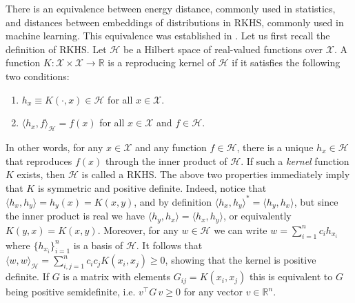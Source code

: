 \documentclass[aps,preprint,nofootinbib,floatfix]{revtex4-1}
\newcommand\kk{K}
\newcommand\kkk{h}
\newcommand\HH{\mathcal{H}}
\begin{document}
There is an equivalence between energy distance, 
commonly used in statistics,
and distances between embeddings of distributions in 
RKHS, commonly used in machine learning. 
This equivalence was established
in \cite{Sejdinovic2013}. Let us first recall the definition of
RKHS. Let $\HH$ be a Hilbert space of real-valued functions
over $\mathcal{X}$. A function 
$\kk : \mathcal{X} \times \mathcal{X} \to 
\mathbb{R}$ is a reproducing kernel of $\HH$ if it satisfies
the following two conditions:
\begin{enumerate}
\item $\kkk_x \equiv \kk(\cdot, x) \in \HH$ 
for all $x \in \mathcal{X}$.
\item $\langle \kkk_x, f \rangle_{\HH} = f(x)$ for
all $x\in\mathcal{X}$ and $f\in \HH$.
\end{enumerate}
In other words, for any $x \in \mathcal{X}$ and any function $f \in \HH$,
there is a unique 
$\kkk_x \in \HH$ that reproduces $f(x)$ through the inner product
of $\HH$.
If such a \emph{kernel} 
function $\kk$ exists, then $\HH$ is called a RKHS. The above two 
properties immediately imply that $\kk$ is symmetric and positive
definite. Indeed, notice that
$\langle \kkk_x, \kkk_y \rangle = \kkk_y(x) = \kk(x,y)$, and by 
definition 
$\langle \kkk_x, \kkk_y \rangle^* = \langle \kkk_y, \kkk_x \rangle$, but
since the inner product is real we have 
$\langle \kkk_y, \kkk_x \rangle = \langle \kkk_x, \kkk_y \rangle$, or
equivalently 
$\kk(y,x) = \kk(x,y)$. Moreover, for any $w \in
\HH$ we can write $w = \sum_{i=1}^n c_i \kkk_{x_i}$ where
$\{ \kkk_{x_i} \}_{i=1}^n$ is a basis of $\HH$. It follows that
$\langle w, w \rangle_{\HH}  = \sum_{i,j=1}^n c_i c_j \kk(x_i,x_j) \ge 0$,
showing that the kernel is positive definite. If $G$ is a matrix with
elements $G_{ij} = \kk(x_i,x_j)$ this is equivalent to $G$ being
positive semidefinite, i.e. $v^\top G \, v \ge 0$ for any vector
$v \in \mathbb{R}^n$.
\end{document}

